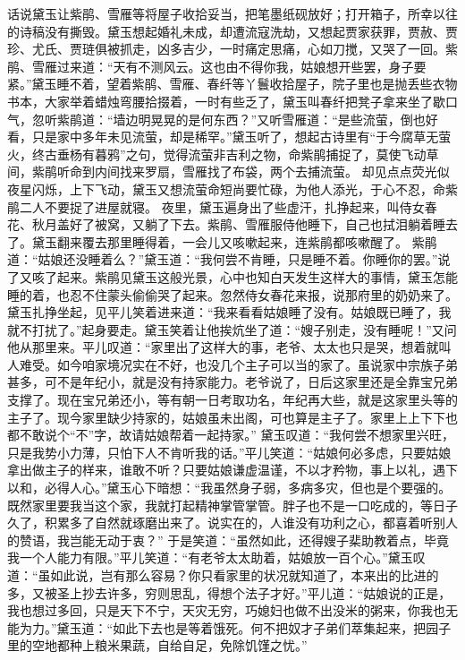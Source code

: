\documentclass[12pt,oneside]{book}
\begin{document}
话说黛玉让紫鹃、雪雁等将屋子收拾妥当，把笔墨纸砚放好；打开箱子，所幸以往的诗稿没有撕毁。黛玉想起婚礼未成，却遭流寇洗劫，又想起贾家获罪，贾赦、贾珍、尤氏、贾琏俱被抓走，凶多吉少，一时痛定思痛，心如刀搅，又哭了一回。紫鹃、雪雁过来道：“天有不测风云。这也由不得你我，姑娘想开些罢，身子要紧。”黛玉睡不着，望着紫鹃、雪雁、春纤等丫鬟收拾屋子，院子里也是抛丢些衣物书本，大家举着蜡烛弯腰拾掇着，一时有些乏了，黛玉叫春纤把凳子拿来坐了歇口气，忽听紫鹃道：“墙边明晃晃的是何东西？”又听雪雁道：“是些流萤，倒也好看，只是家中多年未见流萤，却是稀罕。”黛玉听了，想起古诗里有“于今腐草无萤火，终古垂杨有暮鸦”之句，觉得流萤非吉利之物，命紫鹃捕捉了，莫使飞动草间，紫鹃听命到内间找来罗扇，雪雁找了布袋，两个去捕流萤。
却见点点荧光似夜星闪烁，上下飞动，黛玉又想流萤命短尚要忙碌，为他人添光，于心不忍，命紫鹃二人不要捉了进屋就寝。
夜里，黛玉遍身出了些虚汗，扎挣起来，叫侍女春花、秋月盖好了被窝，又躺了下去。紫鹃、雪雁服侍他睡下，自己也拭泪躺着睡去了。黛玉翻来覆去那里睡得着，一会儿又咳嗽起来，连紫鹃都咳嗽醒了。
紫鹃道：“姑娘还没睡着么？”黛玉道：“我何尝不肯睡，只是睡不着。你睡你的罢。”说了又咳了起来。紫鹃见黛玉这般光景，心中也知白天发生这样大的事情，黛玉怎能睡的着，也忍不住蒙头偷偷哭了起来。忽然侍女春花来报，说那府里的奶奶来了。
黛玉扎挣坐起，见平儿笑着进来道：“我来看看姑娘睡了没有。姑娘既已睡了，我就不打扰了。”起身要走。黛玉笑着让他挨炕坐了道：“嫂子别走，没有睡呢！”又问他从那里来。平儿叹道：“家里出了这样大的事，老爷、太太也只是哭，想着就叫人难受。如今咱家境况实在不好，也没几个主子可以当的家了。虽说家中宗族子弟甚多，可不是年纪小，就是没有持家能力。老爷说了，日后这家里还是全靠宝兄弟支撑了。现在宝兄弟还小，等有朝一日考取功名，年纪再大些，就是这家里头等的主子了。现今家里缺少持家的，姑娘虽未出阁，可也算是主子了。家里上上下下也都不敢说个“不”字，故请姑娘帮着一起持家。”
黛玉叹道：“我何尝不想家里兴旺，只是我势小力薄，只怕下人不肯听我的话。”平儿笑道：“姑娘何必多虑，只要姑娘拿出做主子的样来，谁敢不听？只要姑娘谦虚温谨，不以才矜物，事上以礼，遇下以和，必得人心。”黛玉心下暗想：“我虽然身子弱，多病多灾，但也是个要强的。既然家里要我当这个家，我就打起精神掌管掌管。胖子也不是一口吃成的，等日子久了，积累多了自然就琢磨出来了。说实在的，人谁没有功利之心，都喜着听别人的赞语，我岂能无动于衷？”
于是笑道：“虽然如此，还得嫂子棐助教着点，毕竟我一个人能力有限。”平儿笑道：“有老爷太太助着，姑娘放一百个心。”黛玉叹道：“虽如此说，岂有那么容易？你只看家里的状况就知道了，本来出的比进的多，又被圣上抄去许多，穷则思乱，得想个法子才好。”平儿道：“姑娘说的正是，我也想过多回，只是天下不宁，天灾无穷，巧媳妇也做不出没米的粥来，你我也无能为力。”黛玉道：“如此下去也是等着饿死。何不把奴才子弟们萃集起来，把园子里的空地都种上粮米果蔬，自给自足，免除饥馑之忧。”
\end{document}
